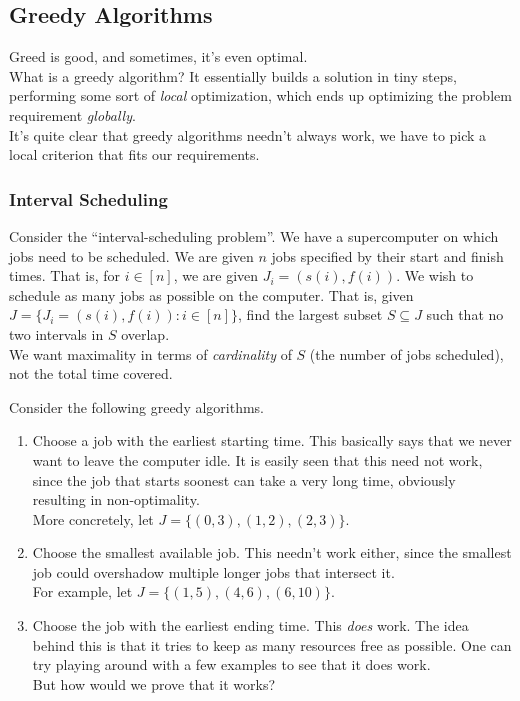 \subsection{Greedy Algorithms}

Greed is good, and sometimes, it's even optimal.\\

What is a greedy algorithm? It essentially builds a solution in tiny steps, performing some sort of \textit{local} optimization, which ends up optimizing the problem requirement \textit{globally}.\\
It's quite clear that greedy algorithms needn't always work, we have to pick a local criterion that fits our requirements.\\

\subsubsection{Interval Scheduling}

Consider the ``interval-scheduling problem''. We have a supercomputer on which jobs need to be scheduled. We are given $n$ jobs specified by their start and finish times. That is, for $i\in[n]$, we are given $J_i = (s(i),f(i))$. We wish to schedule as many jobs as possible on the computer. That is, given $J = \{J_i = (s(i),f(i)) : i\in[n]\}$, find the largest subset $S\subseteq J$ such that no two intervals in $S$ overlap.\\
We want maximality in terms of \textit{cardinality} of $S$ (the number of jobs scheduled), not the total time covered.

Consider the following greedy algorithms.

\begin{enumerate}
	\item Choose a job with the earliest starting time. This basically says that we never want to leave the computer idle. It is easily seen that this need not work, since the job that starts soonest can take a very long time, obviously resulting in non-optimality.\\
	More concretely, let $J = \{(0,3),(1,2),(2,3)\}$.

	\item Choose the smallest available job. This needn't work either, since the smallest job could overshadow multiple longer jobs that intersect it.\\
	For example, let $J=\{(1,5),(4,6),(6,10)\}$.

	\item Choose the job with the earliest ending time. This \textit{does} work. The idea behind this is that it tries to keep as many resources free as possible. One can try playing around with a few examples to see that it does work.\\
	But how would we prove that it works?
\end{enumerate}

